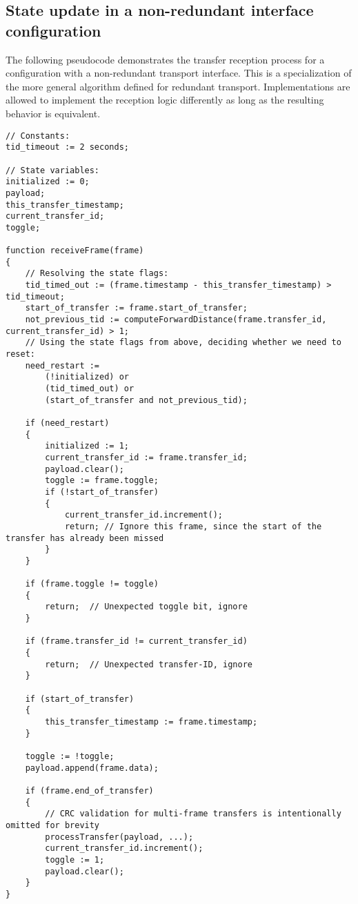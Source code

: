 \clearpage
\subsection{State update in a non-redundant interface configuration}
\label{sec:transfer_reception_state_update_non_redundant}

The following pseudocode demonstrates the transfer reception process for a configuration
with a non-redundant transport interface.
This is a specialization of the more general algorithm defined for redundant transport.
Implementations are allowed to implement the reception logic differently as long as the resulting
behavior is equivalent.

\begin{verbatim}
// Constants:
tid_timeout := 2 seconds;

// State variables:
initialized := 0;
payload;
this_transfer_timestamp;
current_transfer_id;
toggle;

function receiveFrame(frame)
{
    // Resolving the state flags:
    tid_timed_out := (frame.timestamp - this_transfer_timestamp) > tid_timeout;
    start_of_transfer := frame.start_of_transfer;
    not_previous_tid := computeForwardDistance(frame.transfer_id, current_transfer_id) > 1;
    // Using the state flags from above, deciding whether we need to reset:
    need_restart :=
        (!initialized) or
        (tid_timed_out) or
        (start_of_transfer and not_previous_tid);

    if (need_restart)
    {
        initialized := 1;
        current_transfer_id := frame.transfer_id;
        payload.clear();
        toggle := frame.toggle;
        if (!start_of_transfer)
        {
            current_transfer_id.increment();
            return; // Ignore this frame, since the start of the transfer has already been missed
        }
    }

    if (frame.toggle != toggle)
    {
        return;  // Unexpected toggle bit, ignore
    }

    if (frame.transfer_id != current_transfer_id)
    {
        return;  // Unexpected transfer-ID, ignore
    }

    if (start_of_transfer)
    {
        this_transfer_timestamp := frame.timestamp;
    }

    toggle := !toggle;
    payload.append(frame.data);

    if (frame.end_of_transfer)
    {
        // CRC validation for multi-frame transfers is intentionally omitted for brevity
        processTransfer(payload, ...);
        current_transfer_id.increment();
        toggle := 1;
        payload.clear();
    }
}
\end{verbatim}

\clearpage
